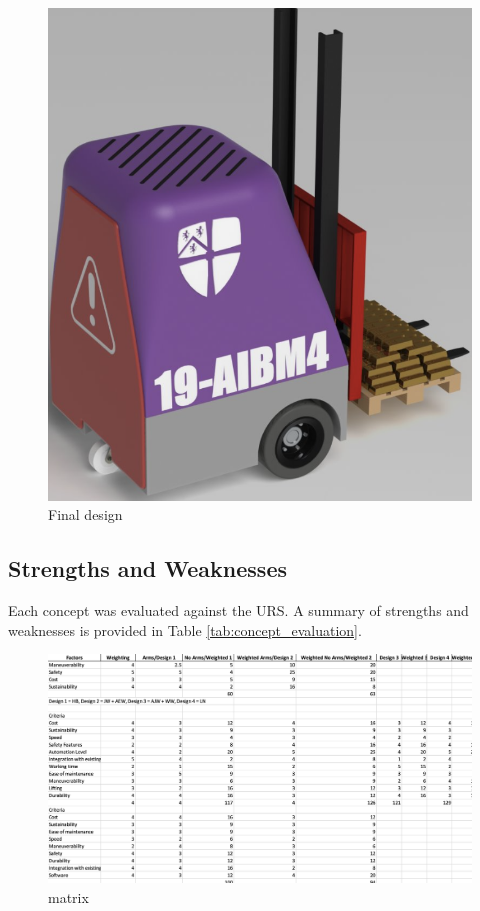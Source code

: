 \documentclass[12pt]{article}
\begin{document}
\begin{enumerate}
\begin{figure}[h!]
\begin{minipage}{0.48\textwidth}
        \includegraphics[width=\textwidth]{finaldesign1.png}
        \caption{Final design}
        \label{fig:final_design}
    \end{minipage}
\end{figure}


\end{enumerate}

\subsection{Strengths and Weaknesses}
Each concept was evaluated against the URS. A summary of strengths and weaknesses is provided in Table \ref{tab:concept_evaluation}.
\begin{figure}[h!]
    \centering
     \includegraphics[width=1\textwidth]{matrix.png}
        \caption{matrix}
         \label{fig:matrix}
 
  
\end{figure}
 
\end{document}
